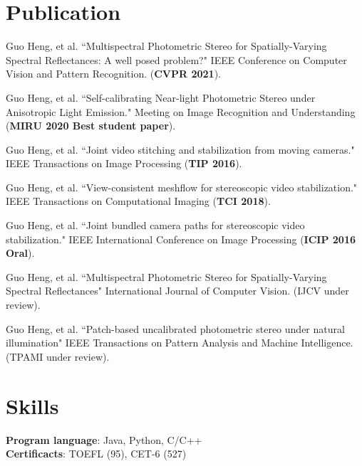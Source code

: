\documentclass[letterpaper,11pt]{article}
\begin{document}
\section{Publication}
\begin{enumerate}[label={[\arabic*]}]
	\item Guo Heng, et al. ``Multispectral Photometric Stereo for Spatially-Varying Spectral Reflectances: A well posed problem?" IEEE Conference on Computer Vision and Pattern Recognition. (\textbf{CVPR 2021}). 
	\item Guo Heng, et al. ``Self-calibrating Near-light Photometric Stereo under Anisotropic Light Emission." Meeting on Image Recognition and Understanding (\textbf{MIRU 2020 Best student paper}).  
	\item Guo Heng, et al. ``Joint video stitching and stabilization from moving cameras." IEEE Transactions on Image Processing (\textbf{TIP 2016}).
	\item Guo Heng, et al. ``View-consistent meshflow for stereoscopic video stabilization." IEEE Transactions on Computational Imaging (\textbf{TCI 2018}).
	\item Guo Heng, et al. ``Joint bundled camera paths for stereoscopic video stabilization." IEEE International Conference on Image Processing (\textbf{ICIP 2016 Oral}).
	\item Guo Heng, et al. ``Multispectral Photometric Stereo for Spatially-Varying Spectral Reflectances" International Journal of Computer Vision. (IJCV under review). 
	\item Guo Heng, et al. ``Patch-based uncalibrated photometric stereo under natural illumination" 
	IEEE Transactions on Pattern Analysis and Machine Intelligence. (TPAMI under review). 
\end{enumerate}

%
\section{Skills}
 \begin{itemize}[leftmargin=0.15in, label={}]
    \small{\item{
     \textbf{Program language}{: Java, Python, C/C++} \\
     \textbf{Certificacts}{: TOEFL (95), CET-6 (527)} \\
    }}
 \end{itemize}


\end{document}
